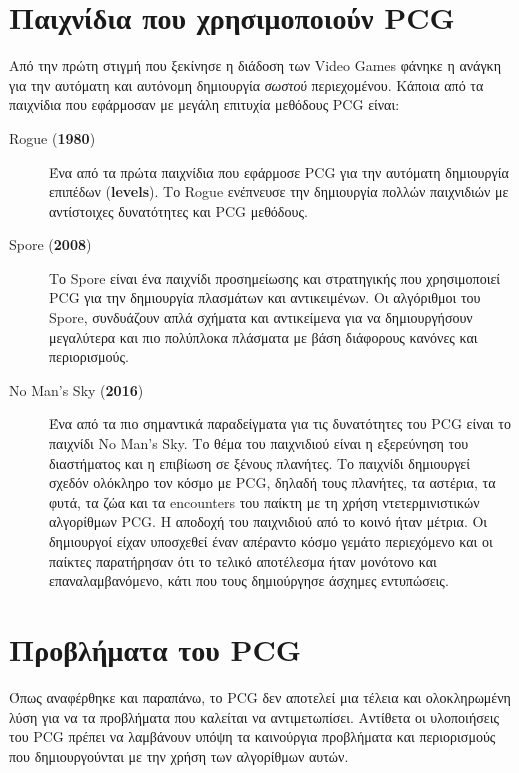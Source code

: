 \section{Παιχνίδια που χρησιμοποιούν PCG}

Από την πρώτη στιγμή που ξεκίνησε η διάδοση των Video Games φάνηκε η ανάγκη για την αυτόματη και αυτόνομη δημιουργία   \textit{σωστού} περιεχομένου. Κάποια από τα παιχνίδια που εφάρμοσαν με μεγάλη επιτυχία μεθόδους PCG είναι:

\begin{description}
\item [Rogue (\textbf{1980})] Ένα από τα πρώτα παιχνίδια που εφάρμοσε PCG για την αυτόματη δημιουργία επιπέδων (\textbf{levels}). Το Rogue ενέπνευσε την δημιουργία πολλών παιχνιδιών με αντίστοιχες δυνατότητες και PCG μεθόδους. \cite{rogue}

\item [Spore (\textbf{2008})] Το Spore είναι ένα παιχνίδι προσημείωσης και στρατηγικής που χρησιμοποιεί PCG για την δημιουργία πλασμάτων και αντικειμένων. Οι αλγόριθμοι του Spore, συνδυάζουν απλά σχήματα και αντικείμενα για να δημιουργήσουν μεγαλύτερα και πιο πολύπλοκα πλάσματα με βάση διάφορους κανόνες και περιορισμούς. \cite{spore} 

\item [No Man's Sky (\textbf{2016})] Ένα από τα πιο σημαντικά παραδείγματα για τις δυνατότητες του PCG είναι το παιχνίδι No Man's Sky. Το θέμα του παιχνιδιού είναι η εξερεύνηση του διαστήματος και η επιβίωση σε ξένους πλανήτες. Το παιχνίδι δημιουργεί σχεδόν ολόκληρο τον κόσμο με PCG, δηλαδή τους πλανήτες, τα αστέρια, τα φυτά, τα ζώα και τα encounters του παίκτη με τη χρήση ντετερμινιστικών αλγορίθμων PCG. Η αποδοχή του παιχνιδιού από το κοινό ήταν μέτρια. Οι δημιουργοί είχαν υποσχεθεί έναν απέραντο κόσμο γεμάτο περιεχόμενο και οι παίκτες παρατήρησαν ότι το τελικό αποτέλεσμα ήταν μονότονο και επαναλαμβανόμενο, κάτι που τους δημιούργησε άσχημες εντυπώσεις.  \cite{nomanssky}
\end{description}

\section{Προβλήματα του PCG}
Όπως αναφέρθηκε και παραπάνω, το PCG δεν αποτελεί μια τέλεια και ολοκληρωμένη λύση για να τα προβλήματα που καλείται να αντιμετωπίσει. Αντίθετα οι υλοποιήσεις του PCG πρέπει να λαμβάνουν υπόψη τα καινούργια προβλήματα και περιορισμούς που δημιουργούνται με την χρήση των αλγορίθμων αυτών. \cite{challenges} \cite{desirableproperties}

